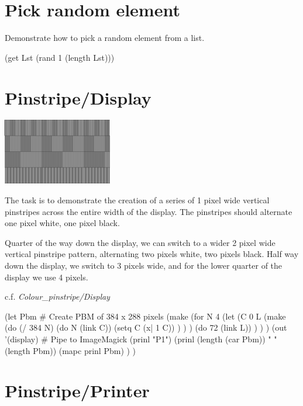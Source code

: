 \pagebreak{}
\section*{Pick random element}

Demonstrate how to pick a random element from a list.

\begin{wideverbatim}

(get Lst (rand 1 (length Lst)))

\end{wideverbatim}

\pagebreak{}
\section*{Pinstripe/Display}

\includegraphics[scale=.6]{graphics/180px-Pinstripe-mono-unicon.png}

The task is to demonstrate the creation of a series of 1 pixel wide
vertical pinstripes across the entire width of the display. The
pinstripes should alternate one pixel white, one pixel black.

Quarter of the way down the display, we can switch to a wider 2 pixel
wide vertical pinstripe pattern, alternating two pixels white, two
pixels black. Half way down the display, we switch to 3 pixels wide, and
for the lower quarter of the display we use 4 pixels.

c.f. \emph{Colour\_pinstripe/Display}

\begin{wideverbatim}

(let Pbm  # Create PBM of 384 x 288 pixels
   (make
      (for N 4
         (let
            (C 0
               L (make
                  (do (/ 384 N)
                     (do N (link C))
                     (setq C (x| 1 C)) ) ) )
            (do 72 (link L)) ) ) )
   (out '(display)  # Pipe to ImageMagick
      (prinl "P1")
      (prinl (length (car Pbm)) " " (length Pbm))
      (mapc prinl Pbm) ) )

\end{wideverbatim}

\pagebreak{}
\section*{Pinstripe/Printer}

